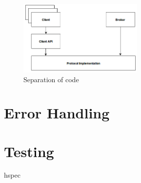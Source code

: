 \begin{figure}[H]
    \centering
    \includegraphics[width=0.55\textwidth]{images/architecture-components.png}
    \caption{Separation of code}
    \label{fig:architecture-components.png}
\end{figure}



 






\section{Error Handling}

\section{Testing}
hspec 

